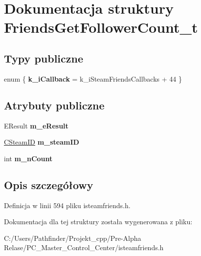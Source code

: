 \hypertarget{struct_friends_get_follower_count__t}{}\section{Dokumentacja struktury Friends\+Get\+Follower\+Count\+\_\+t}
\label{struct_friends_get_follower_count__t}
\subsection*{Typy publiczne}
\begin{DoxyCompactItemize}
\item 
\mbox{\label{struct_friends_get_follower_count__t_a357d6dfbd53dbad1684123dd3cc41dfb}} 
enum \{ {\bfseries k\+\_\+i\+Callback} = k\+\_\+i\+Steam\+Friends\+Callbacks + 44
 \}
\end{DoxyCompactItemize}
\subsection*{Atrybuty publiczne}
\begin{DoxyCompactItemize}
\item 
\mbox{\label{struct_friends_get_follower_count__t_a846a97afd966cbc772ed2f56cae8467f}} 
E\+Result {\bfseries m\+\_\+e\+Result}
\item 
\mbox{\label{struct_friends_get_follower_count__t_a511ffa811d71842a84c68eab3789873a}} 
\hyperlink{class_c_steam_i_d}{C\+Steam\+ID} {\bfseries m\+\_\+steam\+ID}
\item 
\mbox{\label{struct_friends_get_follower_count__t_ac1c2521cf06691e4ce7437460fbbfdef}} 
int {\bfseries m\+\_\+n\+Count}
\end{DoxyCompactItemize}


\subsection{Opis szczegółowy}


Definicja w linii 594 pliku isteamfriends.\+h.



Dokumentacja dla tej struktury została wygenerowana z pliku\+:\begin{DoxyCompactItemize}
\item 
C\+:/\+Users/\+Pathfinder/\+Projekt\+\_\+cpp/\+Pre-\/\+Alpha Relase/\+P\+C\+\_\+\+Master\+\_\+\+Control\+\_\+\+Center/isteamfriends.\+h\end{DoxyCompactItemize}

